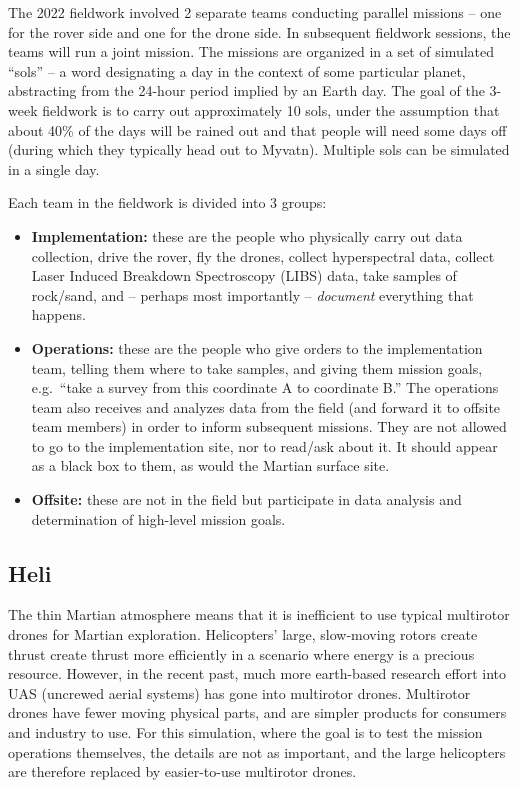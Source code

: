 The 2022 fieldwork involved 2 separate teams
conducting parallel missions -- one for the rover side and one for the drone side.
In subsequent fieldwork sessions, the teams will run a joint mission.
The missions are organized in a set of simulated ``sols'' -- a word designating a day in the context
of some particular planet, abstracting from the 24-hour period implied by an Earth day.
The goal of the 3-week fieldwork is to carry out approximately 10 sols,
under the assumption that about 40\% of the days will be rained out
and that people will need some days off (during which they typically head out to Myvatn).
Multiple sols can be simulated in a single day.

Each team in the fieldwork is divided into 3 groups:
\begin{itemize}
	\item \textbf{Implementation:} these are the people who physically carry out data collection,
	drive the rover, fly the drones, collect hyperspectral data, 
	collect Laser Induced Breakdown Spectroscopy (LIBS) data, take samples of rock/sand,
	and -- perhaps most importantly -- \emph{document} everything that happens.
	\item \textbf{Operations:} these are the people who give orders to the implementation team,
	telling them where to take samples, and giving them mission goals,
	e.g.~``take a survey from this coordinate A to coordinate B.''
	The operations team also receives and analyzes data from the field (and forward it to offsite
	team members) in order to inform subsequent missions.
	They are not allowed to go to the implementation site, nor to read/ask about it.
	It should appear as a black box to them, as would the Martian surface site.
	\item \textbf{Offsite:} these are not in the field but participate in data analysis
	and determination of high-level mission goals.
\end{itemize}

\subsection{Heli}
The thin Martian atmosphere means that it is inefficient to use typical multirotor drones for
Martian exploration.
Helicopters' large, slow-moving rotors create thrust create thrust more efficiently in a scenario
where energy is a precious resource.
However, in the recent past, much more earth-based research effort into UAS (uncrewed aerial systems)
has gone into multirotor drones.
Multirotor drones have fewer moving physical parts, and are simpler products for consumers
and industry to use.
For this simulation, where the goal is to test the mission operations themselves,
the details are not as important, and the large helicopters are therefore replaced by easier-to-use
multirotor drones.

